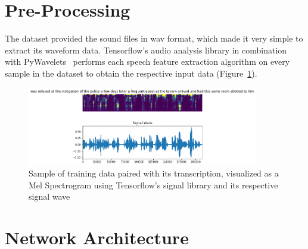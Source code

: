 \section{Pre-Processing}

The dataset provided the sound files in wav format, which made it very simple to extract its waveform data. Tensorflow’s audio analysis library in combination with PyWavelets~\cite{lee_gommers_waselewski_wohlfahrt_oleary_2019} performs each speech feature extraction algorithm on every sample in the dataset to obtain the respective input data (Figure~\ref{fig:MelSample}).

\begin{figure}[th]
    \centering
    \includegraphics[width=0.9\textwidth]{Figures/melsample.png}
    \decoRule
    \caption[Mel Sample]{Sample of training data paired with its transcription, visualized as a Mel Spectrogram using Tensorflow’s signal library and its respective signal wave}
    \label{fig:MelSample}
\end{figure}

\section{Network Architecture}

